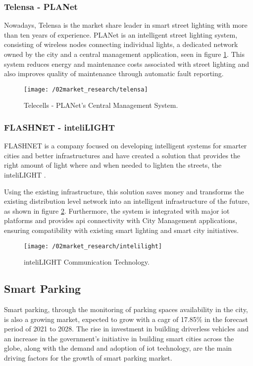 \subsubsection{Telensa - PLANet}
Nowadays, Telensa is the market share leader in smart street lighting with more than ten years of experience.\cite{telensa_solutions} PLANet is an intelligent street lighting system, consisting of wireless nodes connecting individual lights, a dedicated network owned by the city and a central management application, seen in figure \ref{fig:telensa}. This system reduces energy and maintenance costs associated with street lighting and also improves quality of maintenance through automatic fault reporting.

\begin{figure}[ht]
	\centering
	\texttt{[image: /02market\_research/telensa]}
	\caption{Telecells - PLANet's Central Management System.}
	\label{fig:telensa}
\end{figure}

\subsubsection{FLASHNET - inteliLIGHT}
FLASHNET is a company focused on developing intelligent systems for smarter cities and better infrastructures and have created a solution that provides the right amount of light where and when needed to lighten the streets, the inteliLIGHT \cite{inteli_light}.

Using the existing infrastructure, this solution saves money and transforms the existing distribution level network into an intelligent infrastructure of the future, as shown in figure \ref{fig:intelilight}. Furthermore, the system is integrated with major \ac{iot} platforms and provides \ac{api} connectivity with City Management applications, ensuring compatibility with existing smart lighting and smart city initiatives.

\begin{figure}[ht]
	\centering
	\texttt{[image: /02market\_research/intelilight]}
	\caption{inteliLIGHT Communication Technology.}
	\label{fig:intelilight}
\end{figure}

\subsection{Smart Parking}
Smart parking, through the monitoring of parking spaces availability in the city, is also a growing market, expected to grow with a \ac{cagr} of 17.85\% in the forecast period of 2021 to 2028.\cite{smart_parking_market} The rise in investment in building driverless vehicles and an increase in the government’s initiative in building smart cities across the globe, along with the demand and adoption of \ac{iot} technology, are the main driving factors for the growth of smart parking market.

